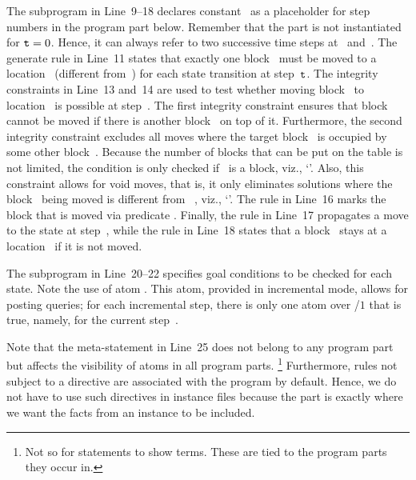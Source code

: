 The  subprogram in Line~9--18 declares constant~ as a placeholder for step numbers in the program part below.
Remember that the  part is not instantiated for $\texttt{t}=0$.
Hence, it can always refer to two successive time steps at~ and~.
The generate rule in Line~11 states that exactly one block~ must be moved to a location~ (different from~) 
for each state transition at step~$\texttt{t}$.
The integrity constraints in Line~13 and~14 are used to test whether moving block~ to location~ is possible at step~.
The first integrity constraint ensures that block~ cannot be moved if there is another block~ on top of it.
Furthermore, the second integrity constraint excludes all moves where the target block~ is occupied %
by some other block~.
Because the number of blocks that can be put on the table is not limited, the condition is only checked if~ is a block, viz., `'.
Also, this constraint allows for void moves, that is,
it only eliminates solutions where the block~ being moved is different from%
~, viz., `'.
The %
rule in Line~16 marks the block that is moved via predicate .
Finally, the %
rule in Line~17 propagates a move to the state at step~,
while the rule in Line~18 states
that a block~ stays at a location~ if it is not moved.

The subprogram  in Line~20--22 %
specifies goal conditions %
to be checked for each state.
Note the use of atom .
This atom, provided in incremental mode, %
allows for posting queries;
for each incremental step, there is only one atom over /$1$ that is true,
namely,  for the current step~.

Note that the  meta-statement in Line~25
does not belong to %
any program part
but affects the visibility of atoms in all program parts.%
\footnote{Not so for  statements to show terms.
These are tied to the program parts they occur in.}
Furthermore, rules not subject to a  directive are associated with the  program by default.
Hence, we do not have to use such directives in instance files
because the  part is exactly where we want the facts from an instance to be
included.

